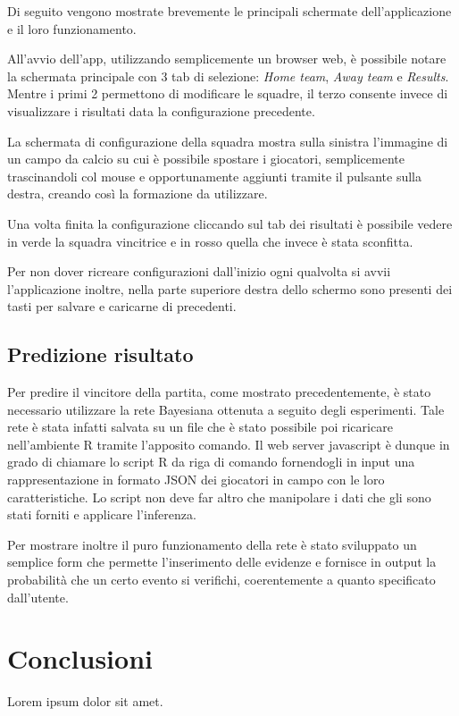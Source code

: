 \documentclass[hidelinks, 12pt]{article}
\begin{document}
Di seguito vengono mostrate brevemente le principali schermate dell'applicazione e il loro funzionamento.

All'avvio dell'app, utilizzando semplicemente un browser web, è possibile notare la schermata principale con 3 tab di selezione: {\it Home team}, {\it Away team} e {\it Results}. Mentre i primi 2 permettono di modificare le squadre, il terzo consente invece di visualizzare i risultati data la configurazione precedente.


La schermata di configurazione della squadra mostra sulla sinistra l'immagine di un campo da calcio su cui è possibile spostare i giocatori, semplicemente trascinandoli col mouse e opportunamente aggiunti tramite il pulsante sulla destra, creando così la formazione da utilizzare.


Una volta finita la configurazione cliccando sul tab dei risultati è possibile vedere in verde la squadra vincitrice e in rosso quella che invece è stata sconfitta.


Per non dover ricreare configurazioni dall'inizio ogni qualvolta si avvii l'applicazione inoltre, nella parte superiore destra dello schermo sono presenti dei tasti per salvare e caricarne di precedenti.




\subsection{Predizione risultato}

Per predire il vincitore della partita, come mostrato precedentemente, è stato necessario utilizzare la rete Bayesiana ottenuta a seguito degli esperimenti. Tale rete è stata infatti salvata su un file che è stato possibile poi ricaricare nell'ambiente R tramite l'apposito comando. Il web server javascript è dunque in grado di chiamare lo script R da riga di comando fornendogli in input una rappresentazione in formato JSON dei giocatori in campo con le loro caratteristiche. Lo script non deve far altro che manipolare i dati che gli sono stati forniti e applicare l'inferenza.

Per mostrare inoltre il puro funzionamento della rete è stato sviluppato un semplice form che permette l'inserimento delle evidenze e fornisce in output la probabilità che un certo evento si verifichi, coerentemente a quanto specificato dall'utente.



\clearpage



\section{Conclusioni}

Lorem ipsum dolor sit amet.




\newpage


	
\end{document}
